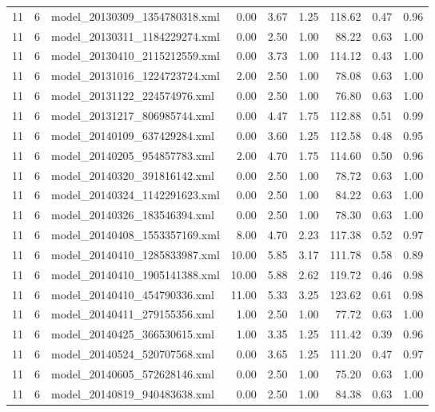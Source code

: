 \begin{table}[ht]
\begin{tabular}{rrlrrrrrr}
   11 &   6 & model\_20130309\_1354780318.xml & 0.00 & 3.67 & 1.25 & 118.62 & 0.47 & 0.96 \\ 
   11 &   6 & model\_20130311\_1184229274.xml & 0.00 & 2.50 & 1.00 & 88.22 & 0.63 & 1.00 \\ 
   11 &   6 & model\_20130410\_2115212559.xml & 0.00 & 3.73 & 1.00 & 114.12 & 0.43 & 1.00 \\ 
   11 &   6 & model\_20131016\_1224723724.xml & 2.00 & 2.50 & 1.00 & 78.08 & 0.63 & 1.00 \\ 
   11 &   6 & model\_20131122\_224574976.xml & 0.00 & 2.50 & 1.00 & 76.80 & 0.63 & 1.00 \\ 
   11 &   6 & model\_20131217\_806985744.xml & 0.00 & 4.47 & 1.75 & 112.88 & 0.51 & 0.99 \\ 
   11 &   6 & model\_20140109\_637429284.xml & 0.00 & 3.60 & 1.25 & 112.58 & 0.48 & 0.95 \\ 
   11 &   6 & model\_20140205\_954857783.xml & 2.00 & 4.70 & 1.75 & 114.60 & 0.50 & 0.96 \\ 
   11 &   6 & model\_20140320\_391816142.xml & 0.00 & 2.50 & 1.00 & 78.72 & 0.63 & 1.00 \\ 
   11 &   6 & model\_20140324\_1142291623.xml & 0.00 & 2.50 & 1.00 & 84.22 & 0.63 & 1.00 \\ 
   11 &   6 & model\_20140326\_183546394.xml & 0.00 & 2.50 & 1.00 & 78.30 & 0.63 & 1.00 \\ 
   11 &   6 & model\_20140408\_1553357169.xml & 8.00 & 4.70 & 2.23 & 117.38 & 0.52 & 0.97 \\ 
   11 &   6 & model\_20140410\_1285833987.xml & 10.00 & 5.85 & 3.17 & 111.78 & 0.58 & 0.89 \\ 
   11 &   6 & model\_20140410\_1905141388.xml & 10.00 & 5.88 & 2.62 & 119.72 & 0.46 & 0.98 \\ 
   11 &   6 & model\_20140410\_454790336.xml & 11.00 & 5.33 & 3.25 & 123.62 & 0.61 & 0.98 \\ 
   11 &   6 & model\_20140411\_279155356.xml & 1.00 & 2.50 & 1.00 & 77.72 & 0.63 & 1.00 \\ 
   11 &   6 & model\_20140425\_366530615.xml & 1.00 & 3.35 & 1.25 & 111.42 & 0.39 & 0.96 \\ 
   11 &   6 & model\_20140524\_520707568.xml & 0.00 & 3.65 & 1.25 & 111.20 & 0.47 & 0.97 \\ 
   11 &   6 & model\_20140605\_572628146.xml & 0.00 & 2.50 & 1.00 & 75.20 & 0.63 & 1.00 \\ 
   11 &   6 & model\_20140819\_940483638.xml & 0.00 & 2.50 & 1.00 & 84.38 & 0.63 & 1.00 \\ 

\end{tabular}
\end{table}
